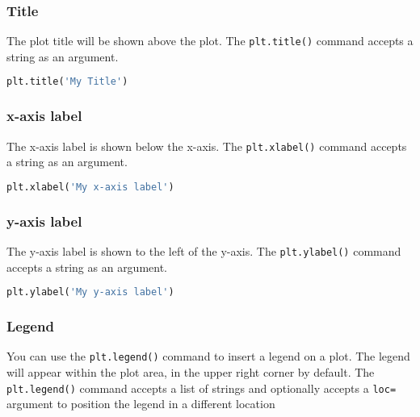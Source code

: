 \documentclass{book}
\newcommand{\passthrough}[1]{#1}
\begin{document}
    
        \hypertarget{title}{%
\subsubsection{Title}\label{title}}

The plot title will be shown above the plot. The
\passthrough{\lstinline!plt.title()!} command accepts a string as an
argument.

\begin{lstlisting}[language=Python]
plt.title('My Title')
\end{lstlisting}
    




    
        \hypertarget{x-axis-label}{%
\subsubsection{x-axis label}\label{x-axis-label}}

The x-axis label is shown below the x-axis. The
\passthrough{\lstinline!plt.xlabel()!} command accepts a string as an
argument.

\begin{lstlisting}[language=Python]
plt.xlabel('My x-axis label')
\end{lstlisting}
    




    
        \hypertarget{y-axis-label}{%
\subsubsection{y-axis label}\label{y-axis-label}}

The y-axis label is shown to the left of the y-axis. The
\passthrough{\lstinline!plt.ylabel()!} command accepts a string as an
argument.

\begin{lstlisting}[language=Python]
plt.ylabel('My y-axis label')
\end{lstlisting}
    




    
        \hypertarget{legend}{%
\subsubsection{Legend}\label{legend}}

You can use the \passthrough{\lstinline!plt.legend()!} command to insert
a legend on a plot. The legend will appear within the plot area, in the
upper right corner by default. The
\passthrough{\lstinline!plt.legend()!} command accepts a list of strings
and optionally accepts a \passthrough{\lstinline!loc=!} argument to
position the legend in a different location
\end{document}
